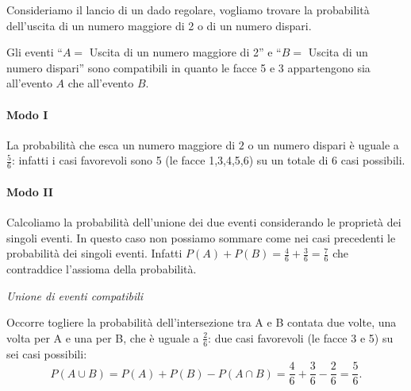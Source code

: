 \begin{esempio}
Consideriamo il lancio di un dado regolare, vogliamo trovare la probabilità 
dell'uscita di un numero maggiore di 2 o di un numero dispari.

Gli eventi ``\( A= \) Uscita di un numero maggiore di 2'' e ``\( B= \) Uscita 
di un 
numero dispari'' sono compatibili in quanto le facce 5 e 3 appartengono sia 
all'evento \(A\) che all'evento \(B\).

\begin{minipage}{.59\textwidth}
\paragraph{Modo I} La probabilità che esca un numero maggiore di \(2\) o un 
numero dispari è uguale a \(\frac 5 6\): infatti i casi favorevoli sono 5 (le 
facce 1,3,4,5,6) su un totale di \(6\) casi possibili.

\paragraph{Modo II} Calcoliamo la probabilità dell'unione dei due eventi 
considerando le proprietà dei singoli eventi. In questo caso non possiamo 
sommare come nei casi precedenti le probabilità dei singoli eventi. Infatti 
\(P(A)+P(B)=\frac 4 6+\frac 3 6=\frac 7 6\) che contraddice l'assioma della 
probabilità. 
\end{minipage}
\hfill
\begin{minipage}{.39\textwidth}
\begin{center}
 \unionecompatibili
\emph{Unione di eventi compatibili}
\end{center}
\end{minipage}

Occorre togliere la probabilità dell'intersezione tra A e B contata 
due volte, una volta per A e una per B, che è uguale a \(\frac 2 6\): due 
casi favorevoli (le facce 3 e 5) su sei casi possibili: 
\[P(A\cup B)=P(A)+P(B)-P(A\cap B)=\frac 4 6+\frac 3 6-\frac 2 6=\frac 5 6.\]
\end{esempio}

